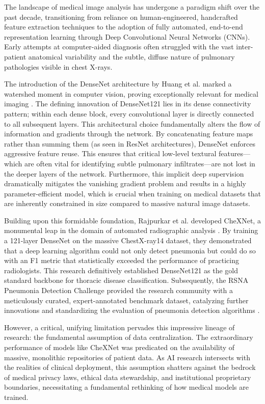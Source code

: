 \documentclass[12pt,a4paper]{report}
\begin{document}
The landscape of medical image analysis has undergone a paradigm shift over the past decade, transitioning from reliance on human-engineered, handcrafted feature extraction techniques to the adoption of fully automated, end-to-end representation learning through Deep Convolutional Neural Networks (CNNs). Early attempts at computer-aided diagnosis often struggled with the vast inter-patient anatomical variability and the subtle, diffuse nature of pulmonary pathologies visible in chest X-rays.

The introduction of the DenseNet architecture by Huang et al. marked a watershed moment in computer vision, proving exceptionally relevant for medical imaging \cite{huang2017densely}. The defining innovation of DenseNet121 lies in its dense connectivity pattern; within each dense block, every convolutional layer is directly connected to all subsequent layers. This architectural choice fundamentally alters the flow of information and gradients through the network. By concatenating feature maps rather than summing them (as seen in ResNet architectures), DenseNet enforces aggressive feature reuse. This ensures that critical low-level textural features---which are often vital for identifying subtle pulmonary infiltrates---are not lost in the deeper layers of the network. Furthermore, this implicit deep supervision dramatically mitigates the vanishing gradient problem and results in a highly parameter-efficient model, which is crucial when training on medical datasets that are inherently constrained in size compared to massive natural image datasets.

Building upon this formidable foundation, Rajpurkar et al. developed CheXNet, a monumental leap in the domain of automated radiographic analysis \cite{rajpurkar2017chexnet}. By training a 121-layer DenseNet on the massive ChestX-ray14 dataset, they demonstrated that a deep learning algorithm could not only detect pneumonia but could do so with an F1 metric that statistically exceeded the performance of practicing radiologists. This research definitively established DenseNet121 as the gold standard backbone for thoracic disease classification. Subsequently, the RSNA Pneumonia Detection Challenge provided the research community with a meticulously curated, expert-annotated benchmark dataset, catalyzing further innovations and standardizing the evaluation of pneumonia detection algorithms \cite{shih2019rsna}.

However, a critical, unifying limitation pervades this impressive lineage of research: the fundamental assumption of data centralization. The extraordinary performance of models like CheXNet was predicated on the availability of massive, monolithic repositories of patient data. As AI research intersects with the realities of clinical deployment, this assumption shatters against the bedrock of medical privacy laws, ethical data stewardship, and institutional proprietary boundaries, necessitating a fundamental rethinking of how medical models are trained.
\end{document}
